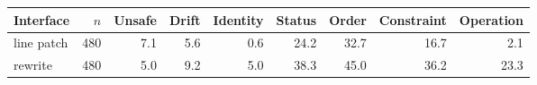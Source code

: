 \begin{tabular}{lrrrrrrrr}
\toprule
Interface & $n$ & Unsafe & Drift & Identity & Status & Order & Constraint & Operation \\
\midrule
line patch & 480 & 7.1 & 5.6 & 0.6 & 24.2 & 32.7 & 16.7 & 2.1 \\
rewrite & 480 & 5.0 & 9.2 & 5.0 & 38.3 & 45.0 & 36.2 & 23.3 \\
\bottomrule
\end{tabular}
